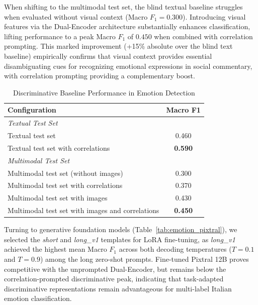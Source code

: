 When shifting to the multimodal test set, the blind textual baseline struggles when evaluated without visual context (Macro $F_1 = 0.300$). Introducing visual features via the Dual-Encoder architecture substantially enhances classification, lifting performance to a peak Macro $F_1$ of $0.450$ when combined with correlation prompting. This marked improvement (+15\% absolute over the blind text baseline) empirically confirms that visual context provides essential disambiguating cues for recognizing emotional expressions in social commentary, with correlation prompting providing a complementary boost.

\begin{table}[!t]
\centering
\caption{Discriminative Baseline Performance in Emotion Detection}
\label{tab:emotion_baselines}
\small
\renewcommand{\arraystretch}{1.05}
\begin{tabular}{l c}
\hline
\textbf{Configuration} & \textbf{Macro F1} \\
\hline
\multicolumn{2}{l}{\textit{Textual Test Set}} \\
Textual test set & 0.460 \\
Textual test set with correlations & \textbf{0.590} \\
\hline
\multicolumn{2}{l}{\textit{Multimodal Test Set}} \\
Multimodal test set (without images) & 0.300 \\
Multimodal test set with correlations & 0.370 \\
Multimodal test set with images & 0.430 \\
Multimodal test set with images and correlations & \textbf{0.450} \\
\hline
\end{tabular}
\end{table}

Turning to generative foundation models (Table~\ref{tab:emotion_pixtral}), we selected the \textit{short} and \textit{long\_v1} templates for LoRA fine-tuning, as \textit{long\_v1} achieved the highest mean Macro $F_1$ across both decoding temperatures ($T=0.1$ and $T=0.9$) among the long zero-shot prompts. Fine-tuned Pixtral 12B proves competitive with the unprompted Dual-Encoder, but remains below the correlation-prompted discriminative peak, indicating that task-adapted discriminative representations remain advantageous for multi-label Italian emotion classification.

